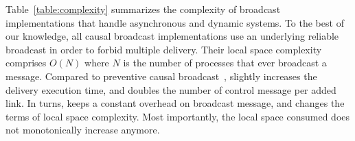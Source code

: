 Table~\ref{table:complexity} summarizes the complexity of broadcast
implementations that handle asynchronous and dynamic systems. To the best of our
knowledge, all causal broadcast implementations use an underlying reliable
broadcast in order to forbid multiple delivery. Their local space complexity
comprises $O(N)$ where $N$ is the number of processes that ever broadcast a
message. Compared to preventive causal broadcast~\cite{nedelec2018pcbroadcast},
\RPCBROADCAST slightly increases the delivery execution time, and doubles the
number of control message per added link. In turns, \RPCBROADCAST keeps a
constant overhead on broadcast message, and changes the terms of local space
complexity. Most importantly, the local space consumed does not monotonically
increase anymore. 

